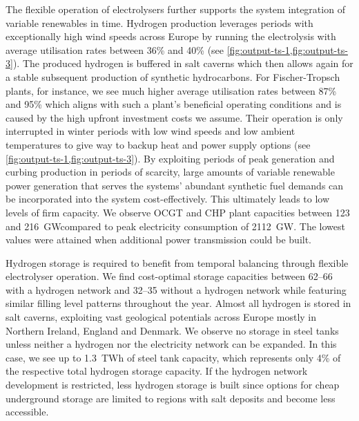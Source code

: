 The flexible operation of electrolysers further supports the system integration
of variable renewables in time. Hydrogen production leverages periods with
exceptionally high wind speeds across Europe by running the electrolysis with
average utilisation rates between 36\% and 40\% (see
\cref{fig:output-ts-1,fig:output-ts-3}).  The produced hydrogen is buffered in
salt caverns which then allows again for a stable subsequent production of
synthetic hydrocarbons. For Fischer-Tropsch plants, for instance, we see much
higher average utilisation rates between 87\% and 95\% which aligns with such a
plant's beneficial operating conditions and is caused by the high upfront
investment costs we assume. Their operation is only interrupted in winter
periods with low wind speeds and low ambient temperatures to give way to backup
heat and power supply options (see \cref{fig:output-ts-1,fig:output-ts-3}). By
exploiting periods of peak generation and curbing production in periods of
scarcity, large amounts of variable renewable power generation that serves the
systems' abundant synthetic fuel demands can be incorporated into the system
cost-effectively. This ultimately leads to low levels of firm capacity. We
observe OCGT and CHP plant capacities between 123 and 216~GW\el compared to peak
electricity consumption of 2112~GW\el. The lowest values were attained when
additional power transmission could be built.


Hydrogen storage is required to benefit from temporal balancing through flexible
electrolyser operation. We find cost-optimal storage capacities between
\SIrange{62}{66}{\twh} with a hydrogen network and \SIrange{32}{35}{\twh}
without a hydrogen network while featuring similar filling level patterns
throughout the year. Almost all hydrogen is stored in salt caverns, exploiting
vast geological potentials across Europe mostly in Northern Ireland, England and
Denmark. We observe no storage in steel tanks unless neither a hydrogen nor the
electricity network can be expanded. In this case, we see up to 1.3~TWh of steel
tank capacity, which represents only 4\% of the respective total hydrogen
storage capacity. If the hydrogen network development is restricted, less
hydrogen storage is built since options for cheap underground storage are
limited to regions with salt deposits and become less accessible.

